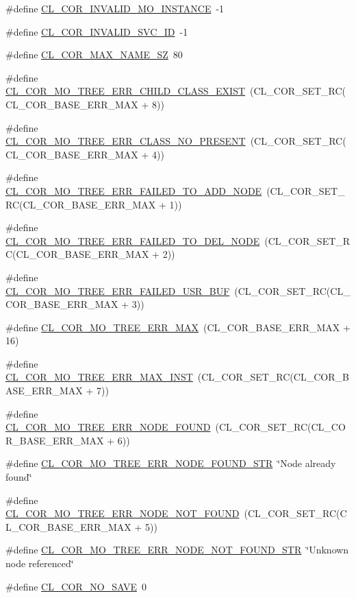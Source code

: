 \begin{CompactItemize}
\#define \hyperlink{group__group13_ga289}{CL\_\-COR\_\-INVALID\_\-MO\_\-INSTANCE}~-1
\item 
\#define \hyperlink{group__group13_ga290}{CL\_\-COR\_\-INVALID\_\-SVC\_\-ID}~-1
\item 
\#define \hyperlink{group__group13_ga280}{CL\_\-COR\_\-MAX\_\-NAME\_\-SZ}~80
\item 
\#define \hyperlink{group__group13_ga199}{CL\_\-COR\_\-MO\_\-TREE\_\-ERR\_\-CHILD\_\-CLASS\_\-EXIST}~(CL\_\-COR\_\-SET\_\-RC(CL\_\-COR\_\-BASE\_\-ERR\_\-MAX + 8))
\item 
\#define \hyperlink{group__group13_ga195}{CL\_\-COR\_\-MO\_\-TREE\_\-ERR\_\-CLASS\_\-NO\_\-PRESENT}~(CL\_\-COR\_\-SET\_\-RC(CL\_\-COR\_\-BASE\_\-ERR\_\-MAX + 4))
\item 
\#define \hyperlink{group__group13_ga192}{CL\_\-COR\_\-MO\_\-TREE\_\-ERR\_\-FAILED\_\-TO\_\-ADD\_\-NODE}~(CL\_\-COR\_\-SET\_\-RC(CL\_\-COR\_\-BASE\_\-ERR\_\-MAX + 1))
\item 
\#define \hyperlink{group__group13_ga193}{CL\_\-COR\_\-MO\_\-TREE\_\-ERR\_\-FAILED\_\-TO\_\-DEL\_\-NODE}~(CL\_\-COR\_\-SET\_\-RC(CL\_\-COR\_\-BASE\_\-ERR\_\-MAX + 2))
\item 
\#define \hyperlink{group__group13_ga194}{CL\_\-COR\_\-MO\_\-TREE\_\-ERR\_\-FAILED\_\-USR\_\-BUF}~(CL\_\-COR\_\-SET\_\-RC(CL\_\-COR\_\-BASE\_\-ERR\_\-MAX + 3))
\item 
\#define \hyperlink{group__group13_ga200}{CL\_\-COR\_\-MO\_\-TREE\_\-ERR\_\-MAX}~(CL\_\-COR\_\-BASE\_\-ERR\_\-MAX + 16)
\item 
\#define \hyperlink{group__group13_ga198}{CL\_\-COR\_\-MO\_\-TREE\_\-ERR\_\-MAX\_\-INST}~(CL\_\-COR\_\-SET\_\-RC(CL\_\-COR\_\-BASE\_\-ERR\_\-MAX + 7))
\item 
\#define \hyperlink{group__group13_ga197}{CL\_\-COR\_\-MO\_\-TREE\_\-ERR\_\-NODE\_\-FOUND}~(CL\_\-COR\_\-SET\_\-RC(CL\_\-COR\_\-BASE\_\-ERR\_\-MAX + 6))
\item 
\#define \hyperlink{group__group13_ga269}{CL\_\-COR\_\-MO\_\-TREE\_\-ERR\_\-NODE\_\-FOUND\_\-STR}~\char`\"{}Node already found\char`\"{}
\item 
\#define \hyperlink{group__group13_ga196}{CL\_\-COR\_\-MO\_\-TREE\_\-ERR\_\-NODE\_\-NOT\_\-FOUND}~(CL\_\-COR\_\-SET\_\-RC(CL\_\-COR\_\-BASE\_\-ERR\_\-MAX + 5))
\item 
\#define \hyperlink{group__group13_ga270}{CL\_\-COR\_\-MO\_\-TREE\_\-ERR\_\-NODE\_\-NOT\_\-FOUND\_\-STR}~\char`\"{}Unknown node referenced\char`\"{}
\item 
\#define \hyperlink{group__group13_ga281}{CL\_\-COR\_\-NO\_\-SAVE}~0

\end{CompactItemize}
